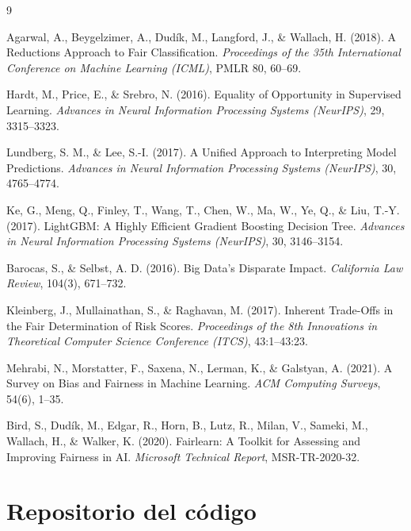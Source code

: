 \documentclass[11pt,a4paper]{article}
\begin{document}
\newpage
\begin{thebibliography}{9}

Agarwal, A., Beygelzimer, A., Dudík, M., Langford, J., \& Wallach, H. (2018).
A Reductions Approach to Fair Classification.
\textit{Proceedings of the 35th International Conference on Machine Learning (ICML)},
PMLR 80, 60--69.

Hardt, M., Price, E., \& Srebro, N. (2016).
Equality of Opportunity in Supervised Learning.
\textit{Advances in Neural Information Processing Systems (NeurIPS)}, 29, 3315--3323.

Lundberg, S. M., \& Lee, S.-I. (2017).
A Unified Approach to Interpreting Model Predictions.
\textit{Advances in Neural Information Processing Systems (NeurIPS)}, 30, 4765--4774.

Ke, G., Meng, Q., Finley, T., Wang, T., Chen, W., Ma, W., Ye, Q., \& Liu, T.-Y. (2017).
LightGBM: A Highly Efficient Gradient Boosting Decision Tree.
\textit{Advances in Neural Information Processing Systems (NeurIPS)}, 30, 3146--3154.

Barocas, S., \& Selbst, A. D. (2016).
Big Data's Disparate Impact.
\textit{California Law Review}, 104(3), 671--732.

Kleinberg, J., Mullainathan, S., \& Raghavan, M. (2017).
Inherent Trade-Offs in the Fair Determination of Risk Scores.
\textit{Proceedings of the 8th Innovations in Theoretical Computer Science Conference (ITCS)},
43:1--43:23.

Mehrabi, N., Morstatter, F., Saxena, N., Lerman, K., \& Galstyan, A. (2021).
A Survey on Bias and Fairness in Machine Learning.
\textit{ACM Computing Surveys}, 54(6), 1--35.

Bird, S., Dudík, M., Edgar, R., Horn, B., Lutz, R., Milan, V., Sameki, M., Wallach, H.,
\& Walker, K. (2020).
Fairlearn: A Toolkit for Assessing and Improving Fairness in AI.
\textit{Microsoft Technical Report}, MSR-TR-2020-32.

\end{thebibliography}

\section{Repositorio del código}
\end{document}
